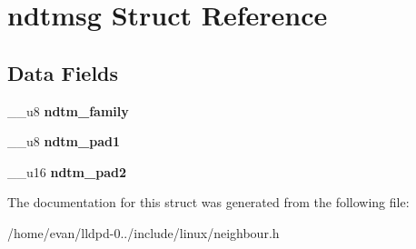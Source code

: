 \section{ndtmsg \-Struct \-Reference}
\label{structndtmsg}
\subsection*{\-Data \-Fields}
\begin{DoxyCompactItemize}
\item 
\-\_\-\-\_\-u8 {\bfseries ndtm\-\_\-family}\label{structndtmsg_a6704a7dd075feae918c74a8191f72a1a}

\item 
\-\_\-\-\_\-u8 {\bfseries ndtm\-\_\-pad1}\label{structndtmsg_a8a7868a8d4d9907d1526a6c6368a123e}

\item 
\-\_\-\-\_\-u16 {\bfseries ndtm\-\_\-pad2}\label{structndtmsg_a9a0383557ab1762d727b0d83247fc458}

\end{DoxyCompactItemize}


\-The documentation for this struct was generated from the following file\-:\begin{DoxyCompactItemize}
\item 
/home/evan/lldpd-\/0../include/linux/neighbour.\-h\end{DoxyCompactItemize}
